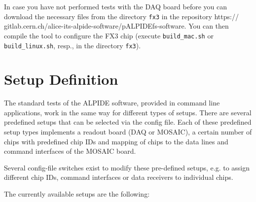 \documentclass{article}
\begin{document}
In case you have not performed tests with the DAQ board before you can download the necessary files from the directory \texttt{fx3} in the repository https:// gitlab.cern.ch/alice-its-alpide-software/pALPIDEfs-software. You can then compile the tool to configure the FX3 chip (execute \texttt{build\_mac.sh} or \texttt{build\_linux.sh}, resp., in the directory \texttt{fx3}).


\section{Setup Definition}

The standard tests of the ALPIDE software, provided in command line applications, work in the same way for different types of setups. There are several predefined setups that can be selected via the config file. Each of these predefined setup types implements a readout board (DAQ or MOSAIC), a certain number of chips with predefined chip IDs and mapping of chips to the data lines and command interfaces of the MOSAIC board.

Several config-file switches exist to modify these pre-defined setups, e.g. to assign different chip IDs, command interfaces or data receivers to individual chips.

The currently available setups are the following:
\end{document}
